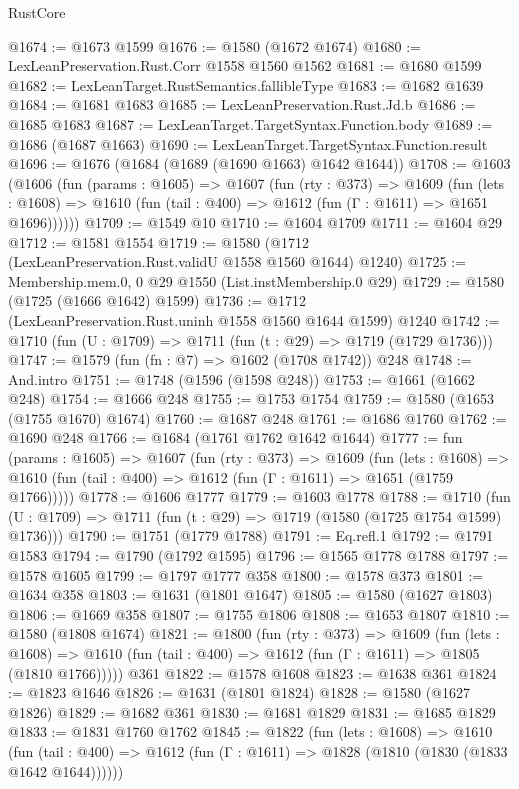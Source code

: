 \begin{lexlean}{RustCore}
\begin{coremodule}
@1674 := @1673 @1599
@1676 := @1580 (@1672 @1674)
@1680 := LexLeanPreservation.Rust.Corr @1558 @1560 @1562
@1681 := @1680 @1599
@1682 := LexLeanTarget.RustSemantics.fallibleType
@1683 := @1682 @1639
@1684 := @1681 @1683
@1685 := LexLeanPreservation.Rust.Jd.b
@1686 := @1685 @1683
@1687 := LexLeanTarget.TargetSyntax.Function.body
@1689 := @1686 (@1687 @1663)
@1690 := LexLeanTarget.TargetSyntax.Function.result
@1696 := @1676 (@1684 (@1689 (@1690 @1663) @1642 @1644))
@1708 := @1603
    (@1606
      (fun (params : @1605) =>
      @1607
        (fun (rty : @373) =>
        @1609
          (fun (lets : @1608) =>
          @1610 (fun (tail : @400) => @1612 (fun (Γ : @1611) => @1651 @1696))))))
@1709 := @1549 @10
@1710 := @1604 @1709
@1711 := @1604 @29
@1712 := @1581 @1554
@1719 := @1580 (@1712 (LexLeanPreservation.Rust.validU @1558 @1560 @1644) @1240)
@1725 := Membership.mem.{0, 0} @29 @1550 (List.instMembership.{0} @29)
@1729 := @1580 (@1725 (@1666 @1642) @1599)
@1736 := @1712 (LexLeanPreservation.Rust.uninh @1558 @1560 @1644 @1599) @1240
@1742 := @1710 (fun (U : @1709) => @1711 (fun (t : @29) => @1719 (@1729 @1736)))
@1747 := @1579 (fun (fn : @7) => @1602 (@1708 @1742)) @248
@1748 := And.intro
@1751 := @1748 (@1596 (@1598 @248))
@1753 := @1661 (@1662 @248)
@1754 := @1666 @248
@1755 := @1753 @1754
@1759 := @1580 (@1653 (@1755 @1670) @1674)
@1760 := @1687 @248
@1761 := @1686 @1760
@1762 := @1690 @248
@1766 := @1684 (@1761 @1762 @1642 @1644)
@1777 := fun (params : @1605) =>
  @1607
    (fun (rty : @373) =>
    @1609
      (fun (lets : @1608) =>
      @1610 (fun (tail : @400) => @1612 (fun (Γ : @1611) => @1651 (@1759 @1766)))))
@1778 := @1606 @1777
@1779 := @1603 @1778
@1788 := @1710 (fun (U : @1709) => @1711 (fun (t : @29) => @1719 (@1580 (@1725 @1754 @1599) @1736)))
@1790 := @1751 (@1779 @1788)
@1791 := Eq.refl.{1}
@1792 := @1791 @1583
@1794 := @1790 (@1792 @1595)
@1796 := @1565 @1778 @1788
@1797 := @1578 @1605
@1799 := @1797 @1777 @358
@1800 := @1578 @373
@1801 := @1634 @358
@1803 := @1631 (@1801 @1647)
@1805 := @1580 (@1627 @1803)
@1806 := @1669 @358
@1807 := @1755 @1806
@1808 := @1653 @1807
@1810 := @1580 (@1808 @1674)
@1821 := @1800
    (fun (rty : @373) =>
    @1609
      (fun (lets : @1608) =>
      @1610 (fun (tail : @400) => @1612 (fun (Γ : @1611) => @1805 (@1810 @1766)))))
    @361
@1822 := @1578 @1608
@1823 := @1638 @361
@1824 := @1823 @1646
@1826 := @1631 (@1801 @1824)
@1828 := @1580 (@1627 @1826)
@1829 := @1682 @361
@1830 := @1681 @1829
@1831 := @1685 @1829
@1833 := @1831 @1760 @1762
@1845 := @1822
    (fun (lets : @1608) =>
    @1610
      (fun (tail : @400) => @1612 (fun (Γ : @1611) => @1828 (@1810 (@1830 (@1833 @1642 @1644))))))

\end{coremodule}
\end{lexlean}
